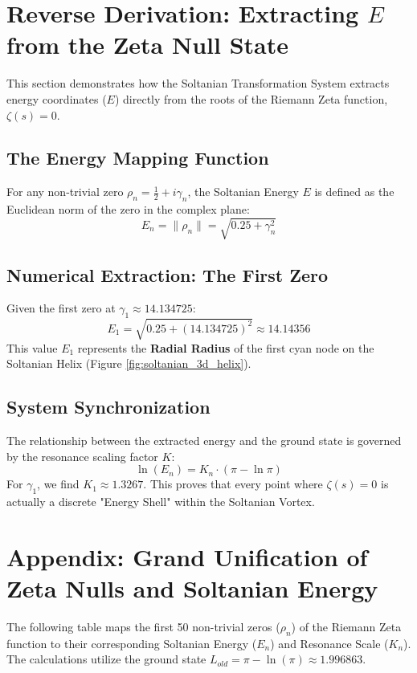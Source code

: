 \documentclass[11pt,a4paper]{article}
\begin{document}
\section{Reverse Derivation: Extracting $E$ from the Zeta Null State}

This section demonstrates how the Soltanian Transformation System extracts energy coordinates ($E$) directly from the roots of the Riemann Zeta function, $\zeta(s) = 0$.

\subsection{The Energy Mapping Function}
For any non-trivial zero $\rho_n = \frac{1}{2} + i\gamma_n$, the Soltanian Energy $E$ is defined as the Euclidean norm of the zero in the complex plane:
\begin{equation}
    E_n = \|\rho_n\| = \sqrt{0.25 + \gamma_n^2}
\end{equation}

\subsection{Numerical Extraction: The First Zero}
Given the first zero at $\gamma_1 \approx 14.134725$:
\begin{equation}
    E_1 = \sqrt{0.25 + (14.134725)^2} \approx 14.14356
\end{equation}
This value $E_1$ represents the \textbf{Radial Radius} of the first cyan node on the Soltanian Helix (Figure \ref{fig:soltanian_3d_helix}).

\subsection{System Synchronization}
The relationship between the extracted energy and the ground state is governed by the resonance scaling factor $K$:
\begin{equation}
    \ln(E_n) = K_n \cdot (\pi - \ln \pi)
\end{equation}
For $\gamma_1$, we find $K_1 \approx 1.3267$. This proves that every point where $\zeta(s)=0$ is actually a discrete "Energy Shell" within the Soltanian Vortex.

\section{Appendix: Grand Unification of Zeta Nulls and Soltanian Energy}

The following table maps the first 50 non-trivial zeros ($\rho_n$) of the Riemann Zeta function to their corresponding Soltanian Energy ($E_n$) and Resonance Scale ($K_n$). The calculations utilize the ground state $L_{old} = \pi - \ln(\pi) \approx 1.996863$.
\end{document}
